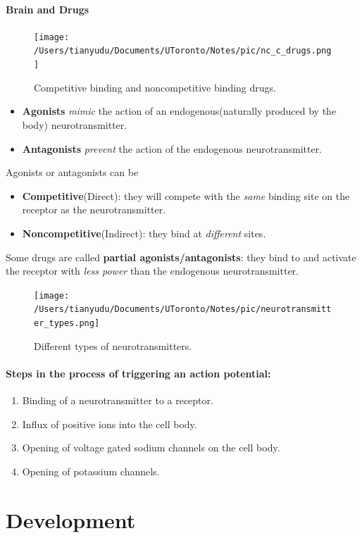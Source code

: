 \documentclass{article}
\begin{document}
	\paragraph{Brain and Drugs}
	\begin{figure}[H]
		\texttt{[image: /Users/tianyudu/Documents/UToronto/Notes/pic/nc\_c\_drugs.png]}
		\caption{Competitive binding and noncompetitive binding drugs.}	
	\end{figure}
	\begin{itemize}
		\item \textbf{Agonists} \emph{mimic} the action of an endogenous(naturally produced by the body) neurotransmitter.
		\item \textbf{Antagonists} \emph{prevent} the action of the endogenous neurotransmitter. 
	\end{itemize}
	\quad \newline Agonists or antagonists can be
	\begin{itemize}
		\item \textbf{Competitive}(Direct): they will compete with the \emph{same} binding site on the receptor as the neurotransmitter.
		\item \textbf{Noncompetitive}(Indirect): they bind at \emph{different} sites.
	\end{itemize}
	\quad \newline Some drugs are called \textbf{partial agonists/antagonists}: they bind to and activate the receptor with \emph{less power} than the endogenous neurotransmitter.
	\begin{figure}[H]
		\centering
		\texttt{[image: /Users/tianyudu/Documents/UToronto/Notes/pic/neurotransmitter\_types.png]}
		\caption{Different types of neurotransmitters.}	
	\end{figure}
	\paragraph{Steps in the process of triggering an action potential:}
	\begin{enumerate}
		\item Binding of a neurotransmitter to a receptor.
		\item Influx of positive ions into the cell body.
		\item Opening of voltage gated sodium channels on the cell body.
		\item Opening of potassium channels.
	\end{enumerate}
	\section{Development}
\end{document}
